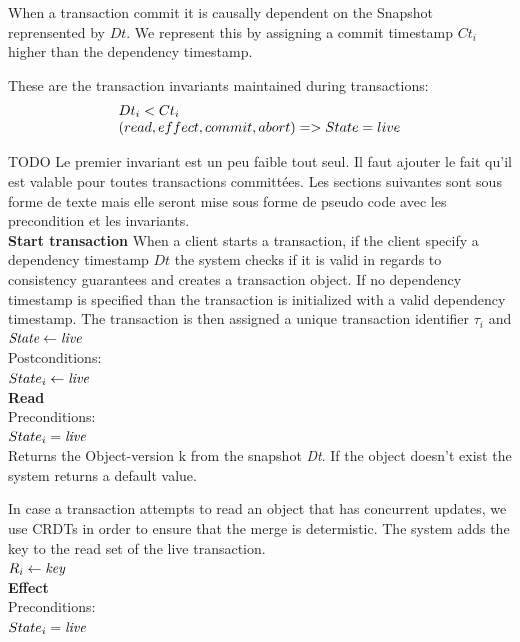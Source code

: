 \documentclass[systeme]{compas2022}
\begin{document}
When a transaction commit it is causally dependent on the Snapshot reprensented by $Dt$.
We represent this by assigning a commit timestamp $Ct_i$ higher than the dependency timestamp.

These are the transaction invariants maintained during transactions:
\[
  \begin{array}{lcl}
    \emph{$Dt_i < Ct_i$}\\
    \emph{$(read, effect, commit, abort) => State = live$}
  \end{array} 
\]


TODO Le premier invariant est un peu faible tout seul. Il faut ajouter le fait qu'il est valable pour toutes transactions committées. Les sections suivantes sont sous forme de texte mais elle seront mise sous forme de pseudo code avec les precondition et les invariants.\\


\textbf{Start transaction}
When a client starts a transaction, if the client specify a dependency timestamp $Dt$ the system checks if it is valid in regards to consistency guarantees and creates a transaction object.
If no dependency timestamp is specified than the transaction is initialized with a valid dependency timestamp.
The transaction is then assigned a unique transaction identifier $\tau_i$ and $\emph{State} \leftarrow \emph{live}$ \\

Postconditions:\\
$State_i \leftarrow \emph{live}$ \\


\textbf{Read}\\
Preconditions:\\ 
$State_i = \emph{live}$ \\

Returns the Object-version k from the snapshot \emph{Dt}. 
If the object doesn't exist the system returns a default value.

In case a transaction attempts to read an object that has concurrent updates, we use CRDTs in order to ensure that the merge is determistic.
The system adds the key to the read set of the live transaction.\\
$R_i \leftarrow \emph{key}$\\

\textbf{Effect}\\
Preconditions:\\ 
$State_i = \emph{live}$ \\
\end{document}
